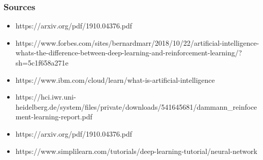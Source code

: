 \begin{frame}
    \frametitle{Sources}
    \begin{itemize}
        \item https://arxiv.org/pdf/1910.04376.pdf
        \item https://www.forbes.com/sites/bernardmarr/2018/10/22/artificial-intelligence-whats-the-difference-between-deep-learning-and-reinforcement-learning/?sh=5c1f658a271e
        \item https://www.ibm.com/cloud/learn/what-is-artificial-intelligence
        \item https://hci.iwr.uni-heidelberg.de/system/files/private/downloads/541645681/dammann\_reinfocement-learning-report.pdf
        \item https://arxiv.org/pdf/1910.04376.pdf
        \item https://www.simplilearn.com/tutorials/deep-learning-tutorial/neural-network
    \end{itemize}
\end{frame}
